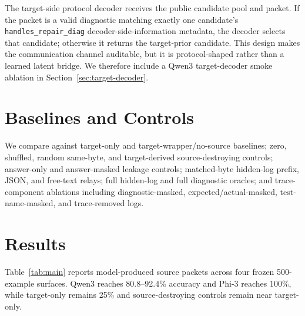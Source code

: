 \documentclass{article}
\begin{document}
The target-side protocol decoder receives the public candidate pool and packet.
If the packet is a valid diagnostic matching exactly one candidate's
\texttt{handles\_repair\_diag} decoder-side-information metadata, the decoder
selects that candidate; otherwise it returns the target-prior candidate. This
design makes the communication channel auditable, but it is protocol-shaped
rather than a learned latent bridge. We therefore include a Qwen3
target-decoder smoke ablation in Section~\ref{sec:target-decoder}.

\section{Baselines and Controls}

We compare against target-only and target-wrapper/no-source baselines; zero,
shuffled, random same-byte, and target-derived source-destroying controls;
answer-only and answer-masked leakage controls; matched-byte hidden-log prefix,
JSON, and free-text relays; full hidden-log and full diagnostic oracles; and
trace-component ablations including diagnostic-masked, expected/actual-masked,
test-name-masked, and trace-removed logs.

\section{Results}

Table~\ref{tab:main} reports model-produced source packets across four frozen
500-example surfaces. Qwen3 reaches 80.8--92.4\% accuracy and Phi-3 reaches
100\%, while target-only remains 25\% and source-destroying controls remain
near target-only.
\end{document}
